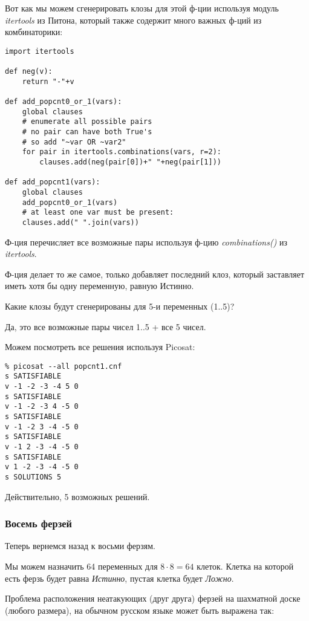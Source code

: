 Вот как мы можем сгенерировать клозы для этой ф-ции используя модуль \textit{itertools} из Питона,
который также содержит много важных ф-ций из комбинаторики:

\begin{lstlisting}
import itertools

def neg(v):
    return "-"+v

def add_popcnt0_or_1(vars):
    global clauses
    # enumerate all possible pairs
    # no pair can have both True's
    # so add "~var OR ~var2"
    for pair in itertools.combinations(vars, r=2):
        clauses.add(neg(pair[0])+" "+neg(pair[1]))

def add_popcnt1(vars):
    global clauses
    add_popcnt0_or_1(vars)
    # at least one var must be present:
    clauses.add(" ".join(vars))
\end{lstlisting}

Ф-ция  перечисляет все возможные пары используя ф-цию \textit{combinations()} из
\textit{itertools}.

Ф-ция  делает то же самое, только добавляет последний клоз, который заставляет иметь хотя бы одну
переменную, равную Истинно.

Какие клозы будут сгенерированы для 5-и переменных (1..5)?



Да, это все возможные пары чисел 1..5 + все 5 чисел.

Можем посмотреть все решения используя Picosat:

\begin{lstlisting}
% picosat --all popcnt1.cnf
s SATISFIABLE
v -1 -2 -3 -4 5 0
s SATISFIABLE
v -1 -2 -3 4 -5 0
s SATISFIABLE
v -1 -2 3 -4 -5 0
s SATISFIABLE
v -1 2 -3 -4 -5 0
s SATISFIABLE
v 1 -2 -3 -4 -5 0
s SOLUTIONS 5
\end{lstlisting}

Действительно, 5 возможных решений.

\subsubsection{Восемь ферзей}

Теперь вернемся назад к восьми ферзям.

Мы можем назначить 64 переменных для $8 \cdot 8=64$ клеток.
Клетка на которой есть ферзь будет равна \textit{Истинно}, пустая клетка будет \textit{Ложно}.

Проблема расположения неатакующих (друг друга) ферзей на шахматной доске (любого размера), на обычном русском
языке может быть выражена так:

